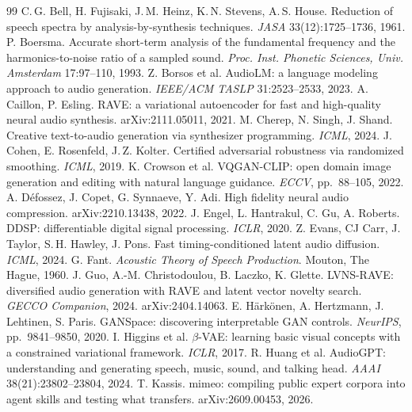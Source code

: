 \documentclass[10pt,twocolumn]{article}
\begin{document}
{\footnotesize
\begin{thebibliography}{99}\setlength{\itemsep}{0pt}\setlength{\parsep}{0pt}
 C.\,G. Bell, H. Fujisaki, J.\,M. Heinz, K.\,N. Stevens, A.\,S. House. Reduction of speech spectra by analysis-by-synthesis techniques. \emph{JASA} 33(12):1725--1736, 1961.
 P. Boersma. Accurate short-term analysis of the fundamental frequency and the harmonics-to-noise ratio of a sampled sound. \emph{Proc. Inst. Phonetic Sciences, Univ. Amsterdam} 17:97--110, 1993.
 Z. Borsos et al. AudioLM: a language modeling approach to audio generation. \emph{IEEE/ACM TASLP} 31:2523--2533, 2023.
 A. Caillon, P. Esling. RAVE: a variational autoencoder for fast and high-quality neural audio synthesis. arXiv:2111.05011, 2021.
 M. Cherep, N. Singh, J. Shand. Creative text-to-audio generation via synthesizer programming. \emph{ICML}, 2024.
 J. Cohen, E. Rosenfeld, J.\,Z. Kolter. Certified adversarial robustness via randomized smoothing. \emph{ICML}, 2019.
 K. Crowson et al. VQGAN-CLIP: open domain image generation and editing with natural language guidance. \emph{ECCV}, pp.\ 88--105, 2022.
 A. Défossez, J. Copet, G. Synnaeve, Y. Adi. High fidelity neural audio compression. arXiv:2210.13438, 2022.
 J. Engel, L. Hantrakul, C. Gu, A. Roberts. DDSP: differentiable digital signal processing. \emph{ICLR}, 2020.
 Z. Evans, CJ Carr, J. Taylor, S.\,H. Hawley, J. Pons. Fast timing-conditioned latent audio diffusion. \emph{ICML}, 2024.
 G. Fant. \emph{Acoustic Theory of Speech Production}. Mouton, The Hague, 1960.
 J. Guo, A.-M. Christodoulou, B. Laczko, K. Glette. LVNS-RAVE: diversified audio generation with RAVE and latent vector novelty search. \emph{GECCO Companion}, 2024. arXiv:2404.14063.
 E. Härkönen, A. Hertzmann, J. Lehtinen, S. Paris. GANSpace: discovering interpretable GAN controls. \emph{NeurIPS}, pp.\ 9841--9850, 2020.
 I. Higgins et al. $\beta$-VAE: learning basic visual concepts with a constrained variational framework. \emph{ICLR}, 2017.
 R. Huang et al. AudioGPT: understanding and generating speech, music, sound, and talking head. \emph{AAAI} 38(21):23802--23804, 2024.
 T. Kassis. mimeo: compiling public expert corpora into agent skills and testing what transfers. arXiv:2609.00453, 2026.

\end{thebibliography}}
\end{document}
